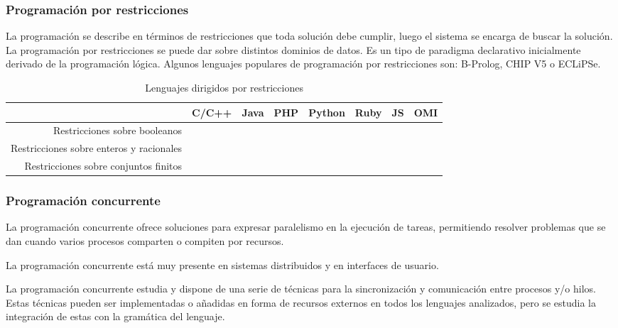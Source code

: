 \subsubsection{Programación por restricciones}
La programación se describe en términos de restricciones que toda solución debe cumplir, luego el
sistema se encarga de buscar la solución. La programación por restricciones se puede dar sobre distintos
dominios de datos. Es un tipo de paradigma declarativo inicialmente derivado de la programación lógica. Algunos 
lenguajes populares de programación por restricciones son: B-Prolog, CHIP V5 o ECLiPSe.

\FloatBarrier
\begin{table}[h]
\begin{center}
 
\begin{tabular}{|r|c|c|c|c|c|c|c|} \hline
 & C/C++ & Java & PHP  & Python & Ruby & JS & OMI\\ \hline
Restricciones sobre booleanos& & & & & & &  \\ \hline
Restricciones sobre enteros y racionales& & & & & & &  \\ \hline
Restricciones sobre conjuntos finitos & & & & & & &  \\ \hline
\end{tabular}
\caption{Lenguajes dirigidos por restricciones}
\end{center}
\end{table}
\FloatBarrier

\subsubsection{Programación concurrente}
La programación concurrente ofrece soluciones para expresar paralelismo en la ejecución de 
tareas, permitiendo resolver problemas que se dan cuando varios procesos comparten o compiten
por recursos.

La programación concurrente está muy presente en sistemas distribuidos y en interfaces de
usuario.

La programación concurrente estudia y dispone de una serie de técnicas para la sincronización 
y comunicación entre procesos y/o hilos. Estas técnicas pueden ser implementadas o añadidas en forma de recursos externos en todos los lenguajes analizados, pero se estudia la integración de estas con la gramática del lenguaje.

